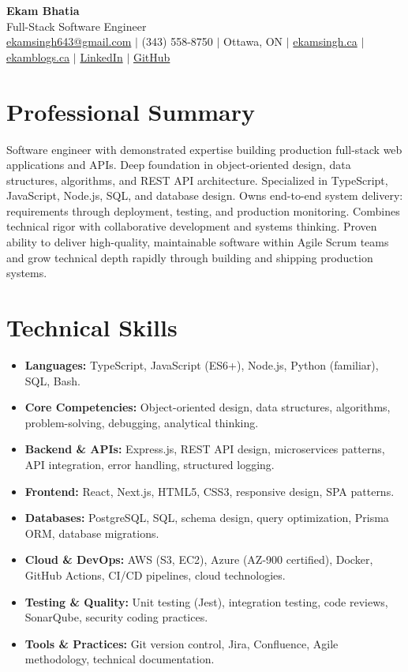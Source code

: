 \documentclass[11pt,a4paper]{article}
\begin{document}
\begin{center}
    {\LARGE \textbf{Ekam Bhatia}} \\
    \vspace{2pt}
    {\normalsize Full-Stack Software Engineer } \\
    \vspace{4pt}
    \small
    \href{mailto:ekamsingh643@gmail.com}{ekamsingh643@gmail.com} $|$
    (343) 558-8750 $|$ Ottawa, ON $|$
    \href{https://www.ekamsingh.ca}{ekamsingh.ca} $|$
    \href{https://www.ekamblogs.ca}{ekamblogs.ca} $|$
    \href{https://www.linkedin.com/in/ekam-bhatia-335840168}{LinkedIn} $|$
    \href{https://github.com/bhat0155}{GitHub}
\end{center}

\section{Professional Summary}
Software engineer with demonstrated expertise building production full-stack web applications and APIs. Deep foundation in object-oriented design, data structures, algorithms, and REST API architecture. Specialized in TypeScript, JavaScript, Node.js, SQL, and database design. Owns end-to-end system delivery: requirements through deployment, testing, and production monitoring. Combines technical rigor with collaborative development and systems thinking. Proven ability to deliver high-quality, maintainable software within Agile Scrum teams and grow technical depth rapidly through building and shipping production systems.

\section{Technical Skills}
\begin{itemize}
    \item \textbf{Languages:} TypeScript, JavaScript (ES6+), Node.js, Python (familiar), SQL, Bash.
    \item \textbf{Core Competencies:} Object-oriented design, data structures, algorithms, problem-solving, debugging, analytical thinking.
    \item \textbf{Backend \& APIs:} Express.js, REST API design, microservices patterns, API integration, error handling, structured logging.
    \item \textbf{Frontend:} React, Next.js, HTML5, CSS3, responsive design, SPA patterns.
    \item \textbf{Databases:} PostgreSQL, SQL, schema design, query optimization, Prisma ORM, database migrations.
    \item \textbf{Cloud \& DevOps:} AWS (S3, EC2), Azure (AZ-900 certified), Docker, GitHub Actions, CI/CD pipelines, cloud technologies.
    \item \textbf{Testing \& Quality:} Unit testing (Jest), integration testing, code reviews, SonarQube, security coding practices.
    \item \textbf{Tools \& Practices:} Git version control, Jira, Confluence, Agile methodology, technical documentation.
\end{itemize}
\end{document}
